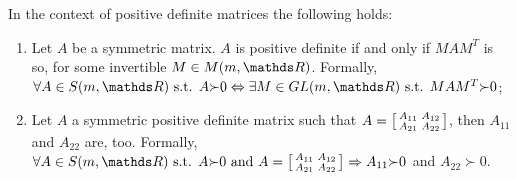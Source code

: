 \documentclass[computationalMathematics.tex]{subfiles}
\begin{document}
\begin{lemma}\label{lemma:23nov1}
  In the context of positive definite matrices the following holds:
\begin{enumerate}
  \item Let $A$ be a symmetric matrix. $A$ is positive definite if and only if $MAM^T$ is so, for some invertible $M \in M(m, \R)$.
    Formally, $\forall A \in S(m, \R) \text{ s.t. } A{\succ} 0 \Leftrightarrow \exists M \in GL(m, \R) \text{ s.t. } MA\tr{M} {\succ} 0$;
	\item Let $A$ a symmetric positive definite matrix such that $A = \begin{bsmallmatrix}
	    A_{11} & A_{12}\\
	    A_{21} & A_{22}
  \end{bsmallmatrix}$, then $A_{11}$ and $A_{22}$ are, too.
    Formally, $\forall A \in S(m, \R) \text{ s.t. } A {\succ} 0 \text{ and } A = \begin{bsmallmatrix}
	    A_{11} & A_{12}\\
	    A_{21} & A_{22}
    \end{bsmallmatrix} \Rightarrow A_{11} {\succ} 0$ and $A_{22} {\succ} 0$.
\end{enumerate}
\end{lemma}
\end{document}
